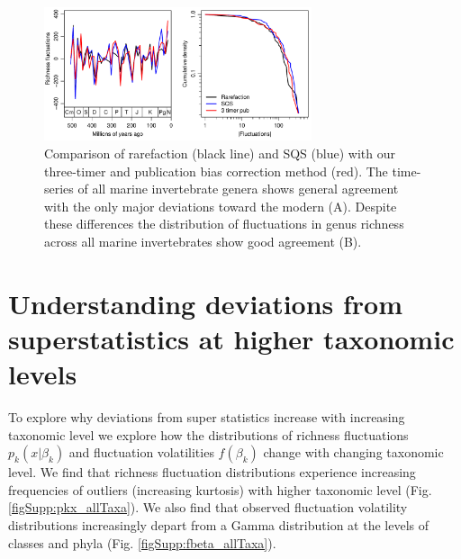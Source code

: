 \documentclass[12pt]{article}
\begin{document}
  
\begin{figure}[!hp]
  \centering
  \includegraphics[width=0.7\textwidth]{../../figSupp_divEstComp.pdf}
  \caption{Comparison of rarefaction (black line) and SQS (blue)
    with our three-timer and publication bias correction method
    (red). The time-series of all marine invertebrate genera shows
    general agreement with the only major deviations toward the modern
    (A). Despite these differences the distribution of fluctuations in
    genus richness across all marine invertebrates show good agreement
    (B).}
  \label{figSupp:3TPub}
\end{figure}


\section{Understanding deviations from superstatistics at higher
  taxonomic levels}
\label{sec:suppSstatTaxLevels}

To explore why deviations from super statistics increase with
increasing taxonomic level we explore how the distributions of
richness fluctuations $p_k(x | \beta_k)$ and fluctuation volatilities
$f(\beta_k)$ change with changing taxonomic level. We find that
richness fluctuation distributions experience increasing frequencies
of outliers (increasing kurtosis) with higher taxonomic level
(Fig. \ref{figSupp:pkx_allTaxa}). We also find that observed
fluctuation volatility distributions increasingly depart from a Gamma
distribution at the levels of classes and phyla
(Fig. \ref{figSupp:fbeta_allTaxa}).
\end{document}
